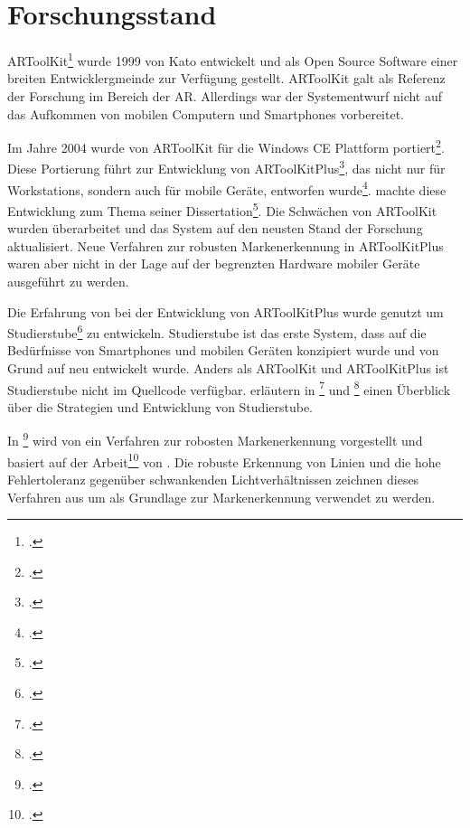 \section{Forschungsstand} %
\label{sec:forschungsstand}
\begin{comment}
	Forschungsstand: Alle untersuchten Arbeiten aufführen und kurz erklären.
\end{comment}

ARToolKit\footcite{artoolkit} wurde 1999 von Kato entwickelt und als Open Source Software einer breiten
 Entwicklergmeinde zur Verfügung gestellt. ARToolKit galt als Referenz der Forschung im Bereich der \gls{AR}.
 Allerdings war der Systementwurf nicht auf das Aufkommen von mobilen Computern und Smartphones vorbereitet.

Im Jahre 2004 wurde von \citeauthor{wagner04} ARToolKit für die Windows CE Plattform portiert\footcite{wagner04}. Diese
 Portierung führt zur Entwicklung von ARToolKitPlus\footcite{artoolkitplus}, das nicht nur für Workstations, sondern
 auch für mobile Geräte, entworfen wurde\footcite{wagner07b}. \citeauthor{wagner07a} machte diese Entwicklung zum Thema
 seiner Dissertation\footcite{wagner07a}. Die Schwächen von ARToolKit wurden überarbeitet und das System auf den neusten
 Stand der Forschung aktualisiert. Neue Verfahren zur robusten Mar\-ken\-er\-kennung in ARToolKitPlus waren aber nicht
 in der Lage auf der begrenzten Hardware mobiler Geräte ausgeführt zu werden.

Die Erfahrung von \citeauthor{wagner04} bei der Entwicklung von ARToolKitPlus wurde genutzt um
 Studierstube\footcite{studierstube} zu entwickeln. Studierstube ist das erste System, dass auf die Bedürfnisse von
 Smartphones und mobilen Geräten konzipiert wurde und von Grund auf neu entwickelt wurde. Anders als ARToolKit und
 ARToolKitPlus ist Studierstube nicht im Quellcode verfügbar.
\citeauthor{wagner09a} erläutern in \footcite{wagner09a} und
 \footcite{wagner09b} einen Überblick über die Strategien und Entwicklung von Studierstube.

In \footcite{hirzer08} wird von \citeauthor{hirzer08} ein Verfahren zur robosten Markenerkennung
 vorgestellt und basiert auf der Arbeit\footcite{clarke96} von \citeauthor{clarke96}. Die robuste Erkennung von Linien
 und die hohe Fehlertoleranz gegenüber schwankenden Lichtverhältnissen zeichnen dieses Verfahren aus um als Grundlage
 zur Markenerkennung verwendet zu werden.

